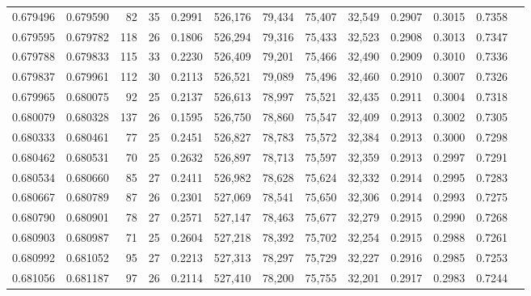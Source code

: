 \begin{tabular}{rrrrrrrrrrrrr}
0.679496 & 0.679590 &    82 &  35 &                                     0.2991 & 526,176 &  79,434 &  75,407 &  32,549 & 0.2907 & 0.3015 & 0.7358 \\
0.679595 & 0.679782 &   118 &  26 &                                     0.1806 & 526,294 &  79,316 &  75,433 &  32,523 & 0.2908 & 0.3013 & 0.7347 \\
0.679788 & 0.679833 &   115 &  33 &                                     0.2230 & 526,409 &  79,201 &  75,466 &  32,490 & 0.2909 & 0.3010 & 0.7336 \\
0.679837 & 0.679961 &   112 &  30 &                                     0.2113 & 526,521 &  79,089 &  75,496 &  32,460 & 0.2910 & 0.3007 & 0.7326 \\
0.679965 & 0.680075 &    92 &  25 &                                     0.2137 & 526,613 &  78,997 &  75,521 &  32,435 & 0.2911 & 0.3004 & 0.7318 \\
0.680079 & 0.680328 &   137 &  26 &                                     0.1595 & 526,750 &  78,860 &  75,547 &  32,409 & 0.2913 & 0.3002 & 0.7305 \\
0.680333 & 0.680461 &    77 &  25 &                                     0.2451 & 526,827 &  78,783 &  75,572 &  32,384 & 0.2913 & 0.3000 & 0.7298 \\
0.680462 & 0.680531 &    70 &  25 &                                     0.2632 & 526,897 &  78,713 &  75,597 &  32,359 & 0.2913 & 0.2997 & 0.7291 \\
0.680534 & 0.680660 &    85 &  27 &                                     0.2411 & 526,982 &  78,628 &  75,624 &  32,332 & 0.2914 & 0.2995 & 0.7283 \\
0.680667 & 0.680789 &    87 &  26 &                                     0.2301 & 527,069 &  78,541 &  75,650 &  32,306 & 0.2914 & 0.2993 & 0.7275 \\
0.680790 & 0.680901 &    78 &  27 &                                     0.2571 & 527,147 &  78,463 &  75,677 &  32,279 & 0.2915 & 0.2990 & 0.7268 \\
0.680903 & 0.680987 &    71 &  25 &                                     0.2604 & 527,218 &  78,392 &  75,702 &  32,254 & 0.2915 & 0.2988 & 0.7261 \\
0.680992 & 0.681052 &    95 &  27 &                                     0.2213 & 527,313 &  78,297 &  75,729 &  32,227 & 0.2916 & 0.2985 & 0.7253 \\
0.681056 & 0.681187 &    97 &  26 &                                     0.2114 & 527,410 &  78,200 &  75,755 &  32,201 & 0.2917 & 0.2983 & 0.7244 \\

\end{tabular}
